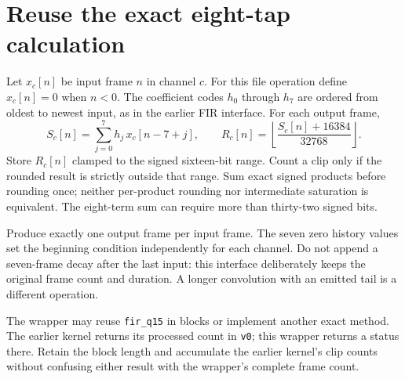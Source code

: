 \section{Reuse the exact eight-tap calculation}
Let $x_c[n]$ be input frame $n$ in channel $c$. For this file operation define
$x_c[n]=0$ when $n<0$. The coefficient codes $h_0$ through $h_7$ are ordered from
oldest to newest input, as in the earlier FIR interface. For each output frame,
\[
  S_c[n]=\sum_{j=0}^{7}h_j\,x_c[n-7+j],\qquad
  R_c[n]=\left\lfloor\frac{S_c[n]+16384}{32768}\right\rfloor.
\]
Store $R_c[n]$ clamped to the signed sixteen-bit range. Count a clip only if the
rounded result is strictly outside that range. Sum exact signed products before
rounding once; neither per-product rounding nor intermediate saturation is equivalent.
The eight-term sum can require more than thirty-two signed bits.

Produce exactly one output frame per input frame. The seven zero history values set
the beginning condition independently for each channel. Do not append a seven-frame
decay after the last input: this interface deliberately keeps the original frame count
and duration. A longer convolution with an emitted tail is a different operation.

The wrapper may reuse \texttt{fir\_q15} in blocks or implement another exact method.
The earlier kernel returns its processed count in \texttt{v0}; this wrapper returns a
status there. Retain the block length and accumulate the earlier kernel's clip counts
without confusing either result with the wrapper's complete frame count.
